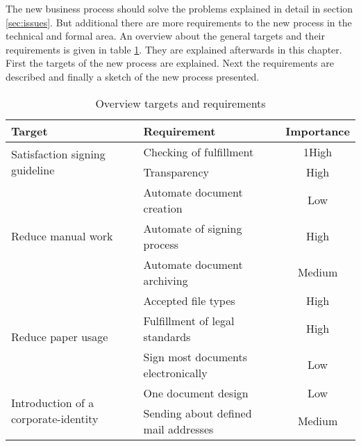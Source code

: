The new business process should solve the problems explained in detail in section \ref{sec:issues}. But additional there are more requirements to the new process in the technical and formal area. An overview about the general targets and their requirements is given in table \ref{tab:overviewTargets}. They are explained afterwards in this chapter. First the targets of the new process are explained. Next the requirements are described and finally a sketch of the new process presented. 

\begin{table}[h!]
	\begin{tabular}{|l|l|c|} \hline
		\rowcolor{Gray}Target & Requirement & Importance \\ \hline
		\multirow{2}{*}{Satisfaction signing guideline} & Checking of fulfillment & 1High \\ \cline{2-3}
														& Transparency & High \\ \hline
		\multirow{3}{*}{Reduce manual work} & Automate document creation & Low \\ \cline{2-3}
											& Automate of signing process & High \\ \cline{2-3}
											& Automate document archiving & Medium \\ \hline
		\multirow{3}{*}{Reduce paper usage} & Accepted file types & High \\ \cline{2-3}
											& Fulfillment of legal standards & High \\ \cline{2-3}
											& Sign most documents electronically & Low \\ \hline
		\multirow{2}{*}{Introduction of a corporate-identity} & One document design & Low \\ \cline{2-3}
											& Sending about defined mail addresses & Medium \\ \hline
	\end{tabular}
	\centering
	\caption{Overview targets and requirements}
	\label{tab:overviewTargets}
\end{table}


